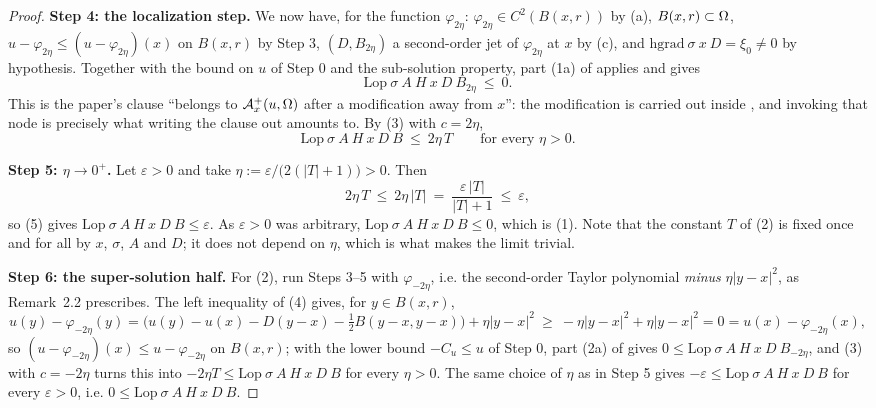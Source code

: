 \begin{proof}
\medskip\noindent\textbf{Step 4: the localization step.} We now have, for the function
$\varphi_{2\eta}$: $\varphi_{2\eta}\in C^{2}(B(x,r))$ by (a), $B(x,r)\subset\Omega$,
$u-\varphi_{2\eta}\le(u-\varphi_{2\eta})(x)$ on $B(x,r)$ by Step 3, $(D,B_{2\eta})$ a
second-order jet of $\varphi_{2\eta}$ at $x$ by (c), and
$\mathrm{hgrad}\ \sigma\ x\ D=\xi_0\ne0$ by hypothesis. Together with the bound on $u$ of
Step 0 and the sub-solution property, part (1a) of  applies
and gives
\[
 \mathrm{Lop}\ \sigma\ A\ H\ x\ D\ B_{2\eta}\ \le\ 0 .
\]
This is the paper's clause ``belongs to $\mathcal A^{+}_x(u,\Omega)$ after a modification away
from $x$'': the modification is carried out inside , and
invoking that node is precisely what writing the clause out amounts to. By (3) with
$c=2\eta$,
\[
 \mathrm{Lop}\ \sigma\ A\ H\ x\ D\ B\ \le\ 2\eta\,T\qquad\text{for every }\eta>0. \tag{5}
\]

\medskip\noindent\textbf{Step 5: $\eta\to0^{+}$.} Let $\varepsilon>0$ and take
$\eta:=\varepsilon/\big(2(|T|+1)\big)>0$. Then
\[
 2\eta\,T\ \le\ 2\eta\,|T|\ =\ \frac{\varepsilon\,|T|}{|T|+1}\ \le\ \varepsilon ,
\]
so (5) gives $\mathrm{Lop}\ \sigma\ A\ H\ x\ D\ B\le\varepsilon$. As $\varepsilon>0$ was
arbitrary, $\mathrm{Lop}\ \sigma\ A\ H\ x\ D\ B\le0$, which is (1). Note that the constant
$T$ of (2) is fixed once and for all by $x$, $\sigma$, $A$ and $D$; it does not depend on
$\eta$, which is what makes the limit trivial.

\medskip\noindent\textbf{Step 6: the super-solution half.} For (2), run Steps 3--5 with
$\varphi_{-2\eta}$, i.e. the second-order Taylor polynomial \emph{minus} $\eta|y-x|^{2}$,
as Remark~2.2 prescribes. The left inequality of (4) gives, for $y\in B(x,r)$,
\[
 u(y)-\varphi_{-2\eta}(y)
 =\Big(u(y)-u(x)-D(y-x)-\tfrac12B(y-x,y-x)\Big)+\eta|y-x|^{2}
 \ \ge\ -\eta|y-x|^{2}+\eta|y-x|^{2}=0=u(x)-\varphi_{-2\eta}(x),
\]
so $(u-\varphi_{-2\eta})(x)\le u-\varphi_{-2\eta}$ on $B(x,r)$; with the lower bound
$-C_u\le u$ of Step 0, part (2a) of  gives
$0\le\mathrm{Lop}\ \sigma\ A\ H\ x\ D\ B_{-2\eta}$, and (3) with $c=-2\eta$ turns this into
$-2\eta T\le\mathrm{Lop}\ \sigma\ A\ H\ x\ D\ B$ for every $\eta>0$. The same choice of
$\eta$ as in Step 5 gives $-\varepsilon\le\mathrm{Lop}\ \sigma\ A\ H\ x\ D\ B$ for every
$\varepsilon>0$, i.e. $0\le\mathrm{Lop}\ \sigma\ A\ H\ x\ D\ B$.
\end{proof}
